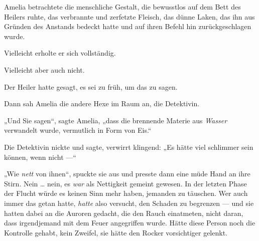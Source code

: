 Amelia betrachtete die menschliche Gestalt, die bewusstlos auf dem Bett des Heilers ruhte, das verbrannte und zerfetzte Fleisch, das dünne Laken, das ihn aus Gründen des Anstands bedeckt hatte und auf ihren Befehl hin zurückgeschlagen wurde.

Vielleicht erholte er sich vollständig.

Vielleicht aber auch nicht.

Der Heiler hatte gesagt, es sei zu früh, um das zu sagen.

Dann sah Amelia die andere Hexe im Raum an, die Detektivin.

„Und Sie sagen“, sagte Amelia, „dass die brennende Materie aus \emph{Wasser} verwandelt wurde, vermutlich in Form von Eis.“

Die Detektivin nickte und sagte, verwirrt klingend:
„Es hätte viel schlimmer sein können, wenn nicht —“

„Wie \emph{nett} von ihnen“, spuckte sie aus und presste dann eine müde Hand an ihre Stirn. Nein … nein, es \emph{war} als Nettigkeit gemeint gewesen. In der letzten Phase der Flucht würde es keinen Sinn mehr haben, jemanden zu täuschen. Wer auch immer das getan hatte, \emph{hatte} also versucht, den Schaden zu begrenzen — und sie hatten dabei an die Auroren gedacht, die den Rauch einatmeten, nicht daran, dass irgendjemand mit dem Feuer angegriffen wurde. Hätte diese Person noch die Kontrolle gehabt, kein Zweifel, sie hätte den Rocker vorsichtiger gelenkt.

